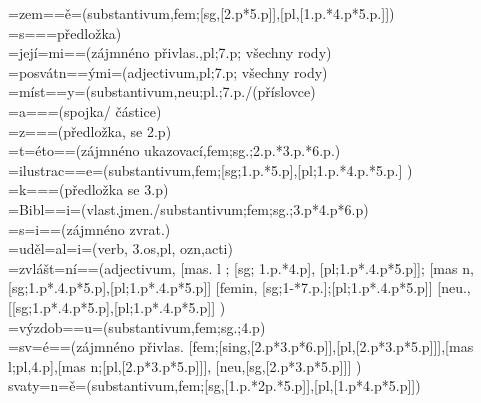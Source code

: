 \documentclass[12pt,a4paper]{article}
\theoremstyle{definition}
\begin{document}
=zem==\v{e}=(substantivum,fem;[sg,[2.p*5.p]],[pl,[1.p.*4.p*5.p.]]) \\
=s===p\v{r}edlo\v{z}ka) \\
=jej\'{i}=mi==(z\'{a}jmn\'{e}no p\v{r}ivlas.,pl;7.p; v\v{s}echny rody) \\
=posv\'{a}tn==\'{y}mi=(adjectivum,pl;7.p; v\v{s}echny rody) \\
=m\'{i}st==y=(substantivum,neu;pl.;7.p./(p\v{r}\'{i}slovce) \\
=a===(spojka/ \v{c}\'{a}stice) \\
=z===(p\v{r}edlo\v{z}ka, se 2.p)\\
=t=\'{e}to==(z\'{a}jmn\'{e}no ukazovac\'{i},fem;sg.;2.p.*3.p.*6.p.) \\
=ilustrac==e=(substantivum,fem;[sg;1.p.*5.p],[pl;1.p.*4.p.*5.p.] )\\
=k===(p\v{r}edlo\v{z}ka se 3.p)\\
=Bibl==i=(vlast.jmen./substantivum;fem;sg.;3.p*4.p*6.p) \\
=s=i==(z\'{a}jmn\'{e}no  zvrat.) \\
=ud\v{e}l=al=i=(verb, 3.os,pl, ozn,acti) \\
=zvl\'{a}\v{s}t=n\'{i}==(adjectivum, [mas. l ; [sg; 1.p.*4.p], [pl;1.p*.4.p*5.p]]; 
[mas n, [sg;1.p*.4.p*5.p],[pl;1.p*.4.p*5.p]] 
[femin, [sg;1-*7.p.];[pl;1.p*.4.p*5.p]] 
[neu., [[sg;1.p*.4.p*5.p],[pl;1.p*.4.p*5.p]] )\\
=v\'{y}zdob==u=(substantivum,fem;sg.;4.p) \\
=sv=\'{e}==(z\'{a}jmn\'{e}no  p\v{r}ivlas. [fem;[sing,[2.p*3.p*6.p]],[pl,[2.p*3.p*5.p]]],[mas l;pl,4.p],[mas n;[pl,[2.p*3.p*5.p]]], [neu,[sg,[2.p*3.p*5.p]]] ) \\
svaty=n=\v{e}=(substantivum,fem;[sg,[1.p.*2p.*5.p]],[pl,[1.p*4.p*5.p]]) \\
\clearpage
\end{document}
